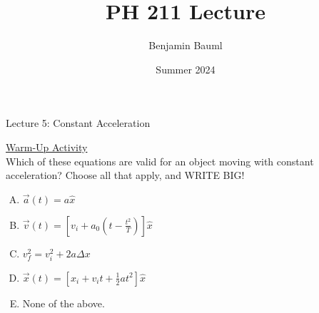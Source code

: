 \documentclass[]{article}
\title{PH 211 Lecture \Week}
\author{Benjamin Bauml}
\date{Summer 2024}
\begin{document}
\begin{TeacherMargin}

\end{TeacherMargin}
\begin{PresentSpace}
\begin{center}
	\huge Lecture 5: Constant Acceleration
\end{center}
\vspace{0.5cm}
\underline{Warm-Up Activity} \\
Which of these equations are valid for an object moving with constant acceleration? Choose all that apply, and WRITE BIG!
\begin{enumerate}[(A)]
	\item $\vec{a}(t)=a\hat{x}$
	\item $\vec{v}(t) = \left[v_{i}+a_{0}\left(t-\frac{t^{2}}{T}\right)\right]\hat{x}$
	\item $v_{f}^{2}=v_{i}^{2}+2a\Delta x$
	\item $\vec{x}(t) = \left[x_{i}+v_{i}t+\frac{1}{2}at^{2}\right]\hat{x}$
	\item None of the above.
\end{enumerate}
\end{PresentSpace}
\newpage
\begin{TeacherMargin}

\end{TeacherMargin}
\end{document}
